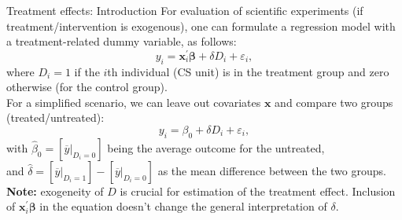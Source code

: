 \documentclass{beamer}
\begin{document}
\begin{frame}{Treatment effects: Introduction}
\small
For evaluation of scientific experiments (if treatment/intervention is exogenous), one can formulate a regression model with a treatment-related dummy variable, as follows:
$$
y_i = \bm{x}_i^{\prime}\bm{\beta} + \delta D_i + \varepsilon_i,
$$
where $D_i = 1$ if the $i$th individual (CS unit) is in the treatment group and zero otherwise (for the control group). \\
\medskip
For a simplified scenario, we can leave out covariates $\bm{x}$ and compare two groups (treated/untreated):
$$
y_i = \beta_0 + \delta D_i + \varepsilon_i,
$$    
with $\hat{\beta}_0 = [\overline{y}|_{D_i=0}]$ being the average outcome for the untreated,\\
and $\hat{\delta} = [\overline{y}|_{D_i=1}] - [\overline{y}|_{D_i=0}]$ as the mean difference between the two groups.\\
\bigskip
\textbf{Note:} exogeneity of $D$ is crucial for estimation of the treatment effect. Inclusion of $\bm{x}_i^{\prime}\bm{\beta}$ in the equation doesn't change the general interpretation of $\delta$.
\end{frame}
\end{document}
